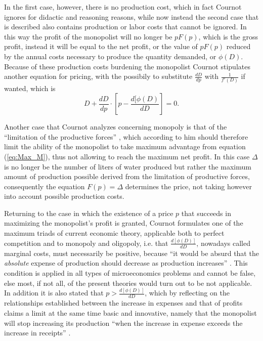 \documentclass[12pt]{article}
\numberwithin{equation}{subsection}
\begin{document}
In the first case, however, there is no production cost, which in fact Cournot ignores for didactic and reasoning reasons, while now instead the second case that is described also contains production or labor costs that cannot be ignored. In this way the profit of the monopolist will no longer be $pF(p)$, which is the gross profit, instead it will be equal to the net profit, or the value of $pF(p)$ reduced by the annual costs necessary to produce the quantity demanded, or $\phi (D)$. Because of these production costs burdening the monopolist Cournot stipulates another equation for pricing, with the possibily to substitute $\frac{dD}{dp}$ with $\frac{1}{f'(D)}$ if wanted, which is \citep[p. 57]{cournot1897researches} \begin{equation}
\label{eq:Max_M}
D + \frac{dD}{dp} \cdot \left[p-\frac{d[\phi (D)}{dD}\right] = 0.
\end{equation}

Another case that Cournot analyzes concerning monopoly is that of the ``limitation of the productive forces'' \cite[p. 58]{cournot1897researches}, which according to him should therefore limit the ability of the monopolist to take maximum advantage from equation (\ref{eq:Max_M}), thus not allowing to reach the maximum net profit. In this case $\Delta$ is no longer be the number of liters of water produced but rather the maximum amount of production possible derived from the limitation of productive forces, consequently the equation $F(p) = \Delta$ determines the price, not taking however into account possible production costs. 

Returning to the case in which the existence of a price $p$ that succeeds in maximizing the monopolist's profit is granted, Cournot  formulates one of the maximum triads of current economic theory, applicable both to perfect competition and to monopoly and oligopoly, i.e. that $\frac{d[\phi(D)]}{dD}$, nowadays called marginal costs, must necessarily be positive, because ``it would be absurd that the \emph{absolute} expense of production should decrease as production increases'' \cite[p. 59]{cournot1897researches}. This condition is applied in all types of microeconomics problems and cannot be false, else most, if not all, of the present theories would turn out to be not applicable. In addition it is also stated that $p > \frac{d[\phi(D)]}{dD}$, which by reflecting on the relationships established between the increase in expenses and that of profits claims a limit at the same time basic and innovative, namely that the monopolist will stop increasing its production ``when the increase in expense exceeds the increase in receipts'' \cite[p. 59]{cournot1897researches}. 
\end{document}
